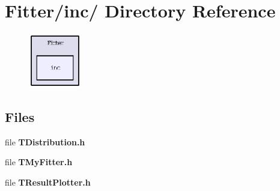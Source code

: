 \section{Fitter/inc/ Directory Reference}
\label{dir_c1ec157ae9bbbe213a3a8aa1358dbead}


\begin{figure}[H]
\begin{center}
\leavevmode
\includegraphics[width=65pt]{dir_c1ec157ae9bbbe213a3a8aa1358dbead_dep}
\end{center}
\end{figure}
\subsection*{Files}
\begin{CompactItemize}
\item 
file \textbf{TDistribution.h}
\item 
file \textbf{TMy\-Fitter.h}
\item 
file \textbf{TResult\-Plotter.h}
\end{CompactItemize}
